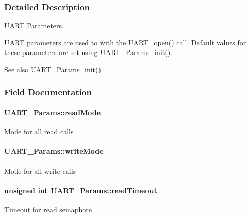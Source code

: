 \subsubsection{Detailed Description}
U\+A\+R\+T Parameters. 

U\+A\+R\+T parameters are used to with the \hyperlink{_u_a_r_t_8h_a0442ea1ec23901168da31726bb3254c1}{U\+A\+R\+T\+\_\+open()} call. Default values for these parameters are set using \hyperlink{_u_a_r_t_8h_a40e5c0823bb7ffd2e8fbf19f9f20b399}{U\+A\+R\+T\+\_\+\+Params\+\_\+init()}.

\begin{DoxySeeAlso}{See also}
\hyperlink{_u_a_r_t_8h_a40e5c0823bb7ffd2e8fbf19f9f20b399}{U\+A\+R\+T\+\_\+\+Params\+\_\+init()} 
\end{DoxySeeAlso}


\subsubsection{Field Documentation}
\paragraph[{read\+Mode}]{ U\+A\+R\+T\+\_\+\+Params\+::read\+Mode}\label{struct_u_a_r_t___params_ab8677572499b3734fcaa00f6431b0e7b}
Mode for all read calls 
\paragraph[{write\+Mode}]{ U\+A\+R\+T\+\_\+\+Params\+::write\+Mode}\label{struct_u_a_r_t___params_a53a95d4c2266d6e7ecea6640baf92d40}
Mode for all write calls 
\paragraph[{read\+Timeout}]{\setlength{\rightskip}{0pt plus 5cm}unsigned int U\+A\+R\+T\+\_\+\+Params\+::read\+Timeout}\label{struct_u_a_r_t___params_a10875d91873fb77106bde0b799f961e2}
Timeout for read semaphore 
